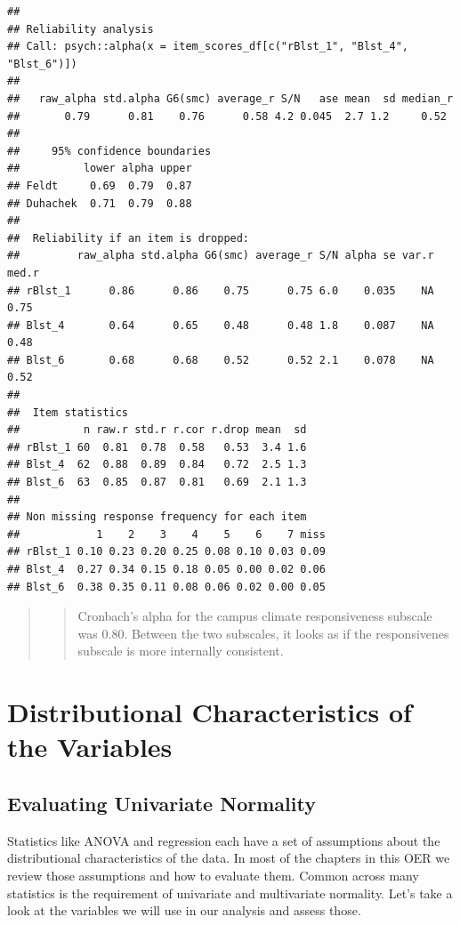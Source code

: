 \documentclass[
  11pt,
]{book}
\begin{document}
\begin{verbatim}
## 
## Reliability analysis   
## Call: psych::alpha(x = item_scores_df[c("rBlst_1", "Blst_4", "Blst_6")])
## 
##   raw_alpha std.alpha G6(smc) average_r S/N   ase mean  sd median_r
##       0.79      0.81    0.76      0.58 4.2 0.045  2.7 1.2     0.52
## 
##     95% confidence boundaries 
##          lower alpha upper
## Feldt     0.69  0.79  0.87
## Duhachek  0.71  0.79  0.88
## 
##  Reliability if an item is dropped:
##         raw_alpha std.alpha G6(smc) average_r S/N alpha se var.r med.r
## rBlst_1      0.86      0.86    0.75      0.75 6.0    0.035    NA  0.75
## Blst_4       0.64      0.65    0.48      0.48 1.8    0.087    NA  0.48
## Blst_6       0.68      0.68    0.52      0.52 2.1    0.078    NA  0.52
## 
##  Item statistics 
##          n raw.r std.r r.cor r.drop mean  sd
## rBlst_1 60  0.81  0.78  0.58   0.53  3.4 1.6
## Blst_4  62  0.88  0.89  0.84   0.72  2.5 1.3
## Blst_6  63  0.85  0.87  0.81   0.69  2.1 1.3
## 
## Non missing response frequency for each item
##            1    2    3    4    5    6    7 miss
## rBlst_1 0.10 0.23 0.20 0.25 0.08 0.10 0.03 0.09
## Blst_4  0.27 0.34 0.15 0.18 0.05 0.00 0.02 0.06
## Blst_6  0.38 0.35 0.11 0.08 0.06 0.02 0.00 0.05
\end{verbatim}

\begin{quote}
\begin{quote}
Cronbach's alpha for the campus climate responsiveness subscale was 0.80. Between the two subscales, it looks as if the responsivenes subscale is more internally consistent.
\end{quote}
\end{quote}

\hypertarget{distributional-characteristics-of-the-variables}{%
\section{Distributional Characteristics of the Variables}\label{distributional-characteristics-of-the-variables}}

\hypertarget{evaluating-univariate-normality}{%
\subsection{Evaluating Univariate Normality}\label{evaluating-univariate-normality}}

Statistics like ANOVA and regression each have a set of assumptions about the distributional characteristics of the data. In most of the chapters in this OER we review those assumptions and how to evaluate them. Common across many statistics is the requirement of univariate and multivariate normality. Let's take a look at the variables we will use in our analysis and assess those.
\end{document}
